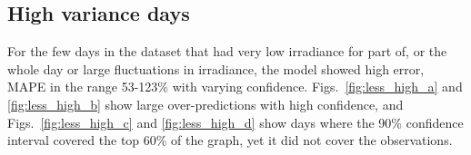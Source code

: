 \subsection{High variance days}
For the few days in the dataset that had very low irradiance for part of, or the whole day or large fluctuations in irradiance, the model showed high error, MAPE in the range 53-123\% with varying confidence. Figs.~\ref{fig:less_high_a} and \ref{fig:less_high_b} show large over-predictions with high confidence, and Figs.~\ref{fig:less_high_c} and \ref{fig:less_high_d} show days where the 90\% confidence interval covered the top 60\% of the graph, yet it did not cover the observations.
\begin{figure}[ht!]
    \centering
    \qquad
    \qquad
    \qquad

\end{figure}
